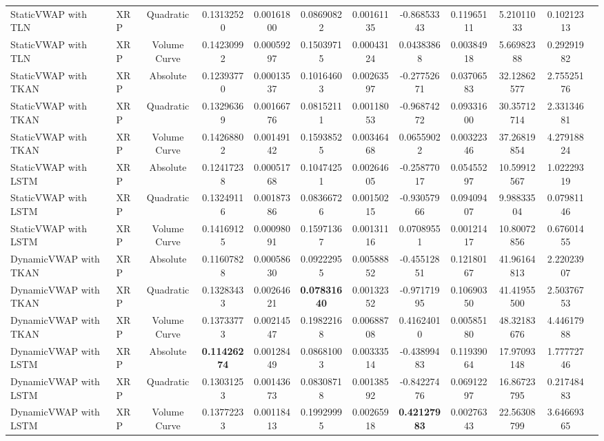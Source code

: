 \begin{table}[H]
{\begin{tabular}{llcccccccccc}
        StaticVWAP with TLN & XRP & Quadratic & 0.13132520 & 0.00161800 & 0.08690822 & 0.00161135 & -0.86853343 & 0.11965111 & 5.21011033 & 0.10212313 \\
        StaticVWAP with TLN & XRP & Volume Curve & 0.14230992 & 0.00059297 & 0.15039715 & 0.00043124 & 0.04383868 & 0.00384918 & 5.66982388 & 0.29291982 \\
        StaticVWAP with TKAN & XRP & Absolute & 0.12393770 & 0.00013537 & 0.10164603 & 0.00263597 & -0.27752671 & 0.03706583 & 32.12862577 & 2.75525176 \\
        StaticVWAP with TKAN & XRP & Quadratic & 0.13296369 & 0.00166776 & 0.08152111 & 0.00118053 & -0.96874272 & 0.09331600 & 30.35712714 & 2.33134681 \\
        StaticVWAP with TKAN & XRP & Volume Curve & 0.14268802 & 0.00149142 & 0.15938525 & 0.00346468 & 0.06559022 & 0.00322346 & 37.26819854 & 4.27918824 \\
        StaticVWAP with LSTM & XRP & Absolute & 0.12417238 & 0.00051768 & 0.10474251 & 0.00264605 & -0.25877017 & 0.05455297 & 10.59912567 & 1.02229319 \\
        StaticVWAP with LSTM & XRP & Quadratic & 0.13249116 & 0.00187386 & 0.08366726 & 0.00150215 & -0.93057966 & 0.09409407 & 9.98833504 & 0.07981146 \\
        StaticVWAP with LSTM & XRP & Volume Curve & 0.14169125 & 0.00098091 & 0.15971367 & 0.00131116 & 0.07089551 & 0.00121417 & 10.80072856 & 0.67601455 \\
        DynamicVWAP with TKAN & XRP & Absolute & 0.11607828 & 0.00058630 & 0.09222955 & 0.00588852 & -0.45512851 & 0.12180167 & 41.96164813 & 2.22023907 \\
        DynamicVWAP with TKAN & XRP & Quadratic & 0.13283433 & 0.00264621 & \textbf{0.07831640} & 0.00132352 & -0.97171995 & 0.10690350 & 41.41955500 & 2.50376753 \\
        DynamicVWAP with TKAN & XRP & Volume Curve & 0.13733773 & 0.00214547 & 0.19822168 & 0.00688708 & 0.41624010 & 0.00585180 & 48.32183676 & 4.44617988 \\
        DynamicVWAP with LSTM & XRP & Absolute & \textbf{0.11426274} & 0.00128449 & 0.08681003 & 0.00333514 & -0.43899483 & 0.11939064 & 17.97093148 & 1.77772746 \\
        DynamicVWAP with LSTM & XRP & Quadratic & 0.13031253 & 0.00143673 & 0.08308718 & 0.00138592 & -0.84227476 & 0.06912297 & 16.86723795 & 0.21748483 \\
        DynamicVWAP with LSTM & XRP & Volume Curve & 0.13772233 & 0.00118413 & 0.19929995 & 0.00265918 & \textbf{0.42127983} & 0.00276343 & 22.56308799 & 3.64669365 \\
        \hline
        \end{tabular}
    }
    \label{table:dynamic_6_step}
\end{table}
        
        